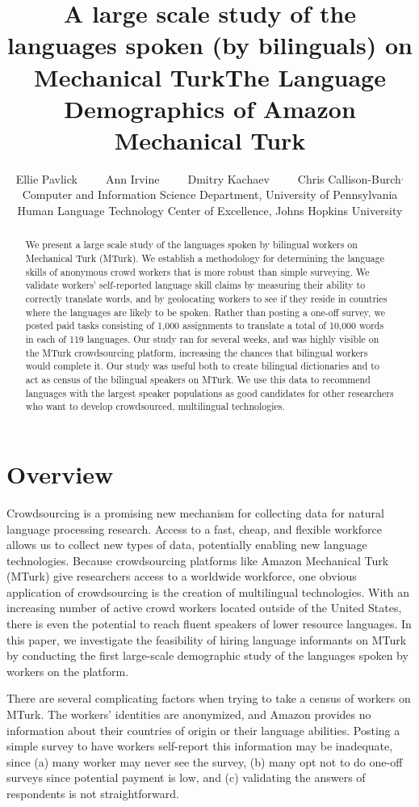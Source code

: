 \documentclass[11pt]{article}
\title{A large scale study of the languages spoken (by bilinguals) on Mechanical Turk}
\title{The Language Demographics of  Amazon Mechanical Turk}
\author{Ellie Pavlick\affliationPenn \ \ \ \ \ Ann Irvine\affliationJHU  \ \ \ \ \ Dmitry Kachaev\affliationJHU  \ \ \ \ \  Chris Callison-Burch\affliationPenn$^{,}$\affliationJHU \\
\affliationPenn Computer and Information Science Department, University of Pennsylvania \\
\affliationJHU Human Language Technology Center of Excellence, Johns Hopkins University \\
  }
\author{}
\date{}
\begin{document}
\maketitle

\begin{abstract}
We present a large scale study of the languages spoken by bilingual workers on Mechanical Turk (MTurk).  
We establish a  methodology for determining the language skills of anonymous crowd workers that is more robust than simple surveying.  We validate workers' self-reported language skill claims by measuring their ability to correctly translate words, and by geolocating workers to see if they reside in countries where the languages are likely to be spoken. Rather than posting a one-off survey, we posted paid tasks consisting of 1,000 assignments to translate a total of 10,000 words in each of 119 languages.  Our study ran for several weeks, and was highly visible on the MTurk crowdsourcing platform, increasing the chances that bilingual workers would complete it.  Our study was useful both to create bilingual dictionaries and to act as census of the bilingual speakers on MTurk.  We use this data to recommend languages with the largest speaker populations as good candidates for other researchers who want to  develop crowdsourced, multilingual technologies.

\end{abstract}

\section{Overview}
Crowdsourcing is a promising new mechanism for collecting data for natural language processing research. Access to a fast, cheap, and flexible workforce allows us to collect new types of data, potentially enabling new language technologies.
Because crowdsourcing platforms like Amazon Mechanical Turk (MTurk) give researchers access to a worldwide workforce, one obvious application of crowdsourcing is the creation of multilingual technologies. 
With an increasing number of active crowd workers located outside of the United States, there is even the potential to reach fluent speakers of lower resource languages.
In this paper, we investigate the feasibility of hiring language informants on MTurk by conducting the first large-scale demographic study of the languages spoken by workers on the platform. 

There are several complicating factors when trying to take a census of workers on MTurk.  The workers' identities are anonymized, and Amazon provides no information about their countries of origin or their language abilities.  Posting a simple survey to have workers self-report this information may be inadequate, since (a) many worker may never see the survey, (b) many opt not to do one-off surveys since potential payment is low, and (c) validating the answers of respondents is not straightforward. 
\end{document}
